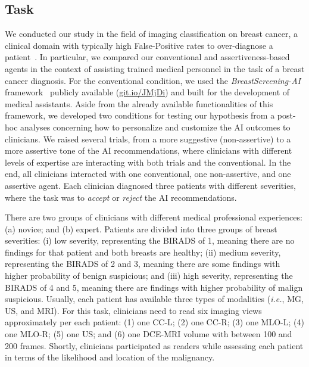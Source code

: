 \subsection{Task}
\label{sec:chap006005001}

We conducted our study in the field of imaging classification on breast cancer, a clinical domain with typically high False-Positive rates to over-diagnose a patient~\cite{KIM2020e138, doi:10.1377/hlthaff.2014.1087}.
In particular, we compared our conventional and assertiveness-based agents in the context of assisting trained medical personnel in the task of a breast cancer diagnosis.
For the conventional condition, we used the {\it BreastScreening-AI} framework~\cite{CALISTO2022102285} publicly available (\href{https://mida-project.github.io/prototype-multi-modality-assistant/}{git.io/JMjDi}) and built for the development of medical assistants.
Aside from the already available functionalities of this framework, we developed two conditions for testing our hypothesis from a post-hoc analyses concerning how to personalize and customize the AI outcomes to clinicians.
We raised several trials, from a more suggestive (non-assertive) to a more assertive tone of the AI recommendations, where clinicians with different levels of expertise are interacting with both trials and the conventional.
In the end, all clinicians interacted with one conventional, one non-assertive, and one assertive agent.
Each clinician diagnosed three patients with different severities, where the task was to {\it accept} or {\it reject} the AI recommendations.

There are two groups of clinicians with different medical professional experiences:
(a) novice; and
(b) expert.
Patients are divided into three groups of breast severities:
(i) low severity, representing the BIRADS of 1, meaning there are no findings for that patient and both breasts are healthy;
(ii) medium severity, representing the BIRADS of 2 and 3, meaning there are some findings with higher probability of benign suspicious; and
(iii) high severity, representing the BIRADS of 4 and 5, meaning there are findings with higher probability of malign suspicious.
Usually, each patient has available three types of modalities ({\it i.e.}, MG, US, and MRI).
For this task, clinicians need to read six imaging views approximately per each patient:
(1) one CC-L;
(2) one CC-R;
(3) one MLO-L;
(4) one MLO-R;
(5) one US; and
(6) one DCE-MRI volume with between 100 and 200 frames.
Shortly, clinicians participated as readers while assessing each patient in terms of the likelihood and location of the malignancy.


